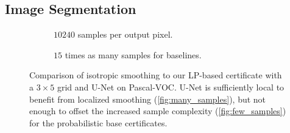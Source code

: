 \documentclass{article} %
\theoremstyle{plain}
\theoremstyle{definition}
\theoremstyle{remark}
\begin{document}

\subsection{Image Segmentation}\label{section:experiments_pascal}

\begin{figure}[t]
	\centering
	\begin{subfigure}[b]{0.49\columnwidth}
		\resizebox{\textwidth}{!}{}
		\caption{
			$10240$ samples per output pixel.
		}
        \label{fig:many_samples}
	\end{subfigure}
	\begin{subfigure}[b]{0.49\columnwidth}
		\resizebox{\textwidth}{!}{}
		\caption{
		      $15$ times as many samples for baselines.
		}
        \label{fig:few_samples}
	\end{subfigure}
	\caption{Comparison of isotropic smoothing  to our LP-based certificate with a $3 \times 5$ grid and U-Net on Pascal-VOC.
            U-Net is sufficiently local to benefit from localized smoothing (\autoref{fig:many_samples}), but not enough to offset the increased sample complexity (\autoref{fig:few_samples}) for the probabilistic base certificates.
   }
   \label{fig:not_masked}
	\vskip-0.2in
\end{figure}
\end{document}
